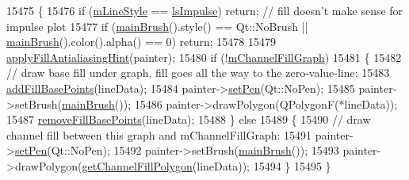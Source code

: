 \begin{DoxyCode}
15475 \{
15476   \textcolor{keywordflow}{if} (\hyperlink{class_q_c_p_graph_a8604fd98402035a63375849f7341ee25}{mLineStyle} == \hyperlink{class_q_c_p_graph_ad60175cd9b5cac937c5ee685c32c0859aa3b358b4ae7cca94aceeb8e529c12ebb}{lsImpulse}) \textcolor{keywordflow}{return}; \textcolor{comment}{// fill doesn't make sense for impulse plot}
15477   \textcolor{keywordflow}{if} (\hyperlink{class_q_c_p_abstract_plottable_ae74c123832da180c17e22203e748d9b7}{mainBrush}().style() == Qt::NoBrush || \hyperlink{class_q_c_p_abstract_plottable_ae74c123832da180c17e22203e748d9b7}{mainBrush}().color().alpha() == 0) \textcolor{keywordflow}{return};
15478   
15479   \hyperlink{class_q_c_p_abstract_plottable_ac08a480155895e674dbfe5a5670e0ff3}{applyFillAntialiasingHint}(painter);
15480   \textcolor{keywordflow}{if} (!\hyperlink{class_q_c_p_graph_a2f1777c7accf8244fc640c33f0b04577}{mChannelFillGraph})
15481   \{
15482     \textcolor{comment}{// draw base fill under graph, fill goes all the way to the zero-value-line:}
15483     \hyperlink{class_q_c_p_graph_a5fa7884620d7c54b81dfbd255d97b636}{addFillBasePoints}(lineData);
15484     painter->\hyperlink{class_q_c_p_painter_af9c7a4cd1791403901f8c5b82a150195}{setPen}(Qt::NoPen);
15485     painter->setBrush(\hyperlink{class_q_c_p_abstract_plottable_ae74c123832da180c17e22203e748d9b7}{mainBrush}());
15486     painter->drawPolygon(QPolygonF(*lineData));
15487     \hyperlink{class_q_c_p_graph_ad31b49a90e91e538fd9caf011c913a68}{removeFillBasePoints}(lineData);
15488   \} \textcolor{keywordflow}{else}
15489   \{
15490     \textcolor{comment}{// draw channel fill between this graph and mChannelFillGraph:}
15491     painter->\hyperlink{class_q_c_p_painter_af9c7a4cd1791403901f8c5b82a150195}{setPen}(Qt::NoPen);
15492     painter->setBrush(\hyperlink{class_q_c_p_abstract_plottable_ae74c123832da180c17e22203e748d9b7}{mainBrush}());
15493     painter->drawPolygon(\hyperlink{class_q_c_p_graph_a0374b7268e35cab9802a6be2b5d726d7}{getChannelFillPolygon}(lineData));
15494   \}
15495 \}
\end{DoxyCode}



